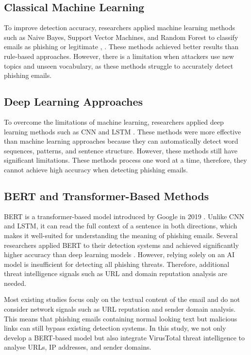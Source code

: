 \documentclass[conference]{IEEEtran}
\begin{document}
\subsection{Classical Machine Learning}

To improve detection accuracy, researchers applied machine learning
methods such as Naive Bayes, Support Vector Machines, and Random
Forest to classify emails as phishing or legitimate
\cite{fette2007}, \cite{toolan2010}. These methods achieved better
results than rule-based approaches. However, there is a limitation
when attackers use new topics and unseen vocabulary, as these
methods struggle to accurately detect phishing emails.

\subsection{Deep Learning Approaches}

To overcome the limitations of machine learning, researchers
applied deep learning methods such as CNN and LSTM
\cite{bahnsen2017}. These methods were more effective than machine
learning approaches because they can automatically detect word
sequences, patterns, and sentence structure. However, these methods
still have significant limitations. These methods process one word
at a time, therefore, they cannot achieve high accuracy when
detecting phishing emails.

\subsection{BERT and Transformer-Based Methods}

BERT is a transformer-based model introduced by Google in 2019
\cite{devlin2019bert}. Unlike CNN and LSTM, it can read the full
context of a sentence in both directions, which makes it
well-suited for understanding the meaning of phishing emails.
Several researchers applied BERT to their detection systems and
achieved significantly higher accuracy than deep learning models
\cite{geng2020}. However, relying solely on an AI model is
insufficient for detecting all phishing threats. Therefore,
additional threat intelligence signals such as URL and domain
reputation analysis are needed.

Most existing studies focus only on the textual content of the
email and do not consider network signals such as URL reputation
and sender domain analysis. This means that phishing emails
containing normal looking text but malicious links can still bypass
existing detection systems. In this study, we not only develop a
BERT-based model but also integrate VirusTotal threat intelligence
to analyse URLs, IP addresses, and sender domains.
\end{document}
